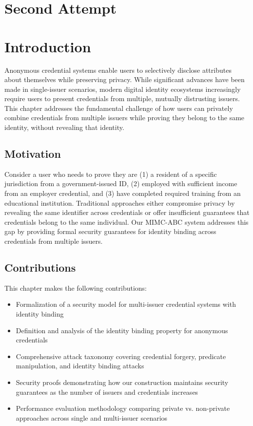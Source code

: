 \section{Second Attempt}

\newpage
\section{Introduction}
Anonymous credential systems enable users to selectively disclose attributes about themselves while preserving privacy. While significant advances have been made in single-issuer scenarios, modern digital identity ecosystems increasingly require users to present credentials from multiple, mutually distrusting issuers. This chapter addresses the fundamental challenge of how users can privately combine credentials from multiple issuers while proving they belong to the same identity, without revealing that identity.

\subsection{Motivation}
Consider a user who needs to prove they are (1) a resident of a specific jurisdiction from a government-issued ID, (2) employed with sufficient income from an employer credential, and (3) have completed required training from an educational institution. Traditional approaches either compromise privacy by revealing the same identifier across credentials or offer insufficient guarantees that credentials belong to the same individual. Our MIMC-ABC system addresses this gap by providing formal security guarantees for identity binding across credentials from multiple issuers.

\subsection{Contributions}
This chapter makes the following contributions:
\begin{itemize}
    \item Formalization of a security model for multi-issuer credential systems with identity binding
    \item Definition and analysis of the identity binding property for anonymous credentials
    \item Comprehensive attack taxonomy covering credential forgery, predicate manipulation, and identity binding attacks
    \item Security proofs demonstrating how our construction maintains security guarantees as the number of issuers and credentials increases
    \item Performance evaluation methodology comparing private vs. non-private approaches across single and multi-issuer scenarios
\end{itemize}

